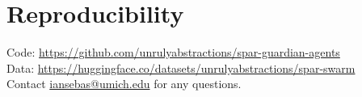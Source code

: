 \section*{Reproducibility}
Code: \url{https://github.com/unrulyabstractions/spar-guardian-agents}\\
Data: \url{https://huggingface.co/datasets/unrulyabstractions/spar-swarm}\\
Contact \href{mailto:iansebas@umich.edu}{iansebas@umich.edu} for any questions.
